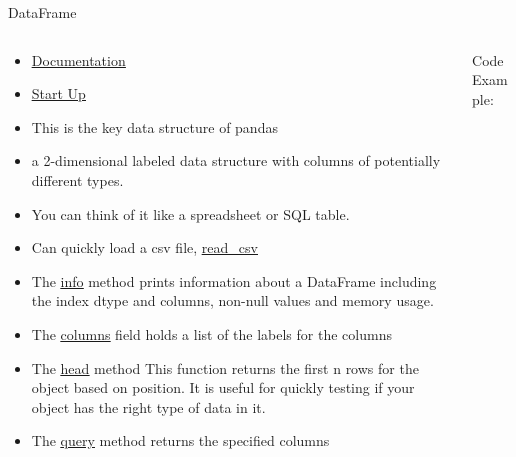 % 
% 
% 
\begin{Slide}{DataFrame}
  \begin{columns}
    \begin{column}{.48\textwidth}
      \tiny
      \begin{itemize}
      \item \underline{\href{https://pandas.pydata.org/docs/reference/frame.html}{Documentation}} 
      \item \underline{\href{https://pandas.pydata.org/docs/user_guide/dsintro.html\#dataframe}{Start Up}} 
      \item This is the key data structure of pandas
      \item a 2-dimensional labeled data structure with columns of potentially different types. 
      \item You can think of it like a spreadsheet or SQL table.
      \item Can quickly load a csv file, \underline{\href{https://pandas.pydata.org/docs/reference/api/pandas.read_csv.html}{read\_csv}}  
      \item The \underline{\href{https://pandas.pydata.org/docs/reference/api/pandas.DataFrame.info.html\#pandas.DataFrame.info}{info}}  method prints information about a DataFrame including the index dtype and columns, non-null values and memory usage.
      \item The \underline{\href{https://pandas.pydata.org/docs/reference/api/pandas.DataFrame.columns.html}{columns}} field holds a list of the labels for the columns
      \item The \underline{\href{https://pandas.pydata.org/docs/reference/api/pandas.DataFrame.head.html}{head}} method This function returns the first n rows for the object based on position. It is useful for quickly testing if your object has the right type of data in it.
      \item The \underline{\href{https://pandas.pydata.org/docs/reference/api/pandas.DataFrame.query.html}{query}} method returns the specified columns
      \end{itemize}
      
      
    \end{column}

    \hfill

    \begin{column}{.48\textwidth}
      Code Example:
      
    \inputminted[firstline=3,
      lastline=23,
      breaklines,
      fontsize=\tiny,
      bgcolor=Background,
      linenos]{python}{../src/data_frame.py}
      
      
    \end{column}
  \end{columns}

\end{Slide}

